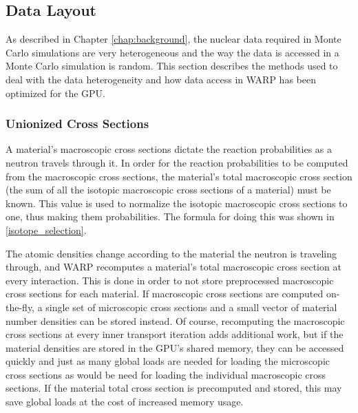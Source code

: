 
\subsection{Data Layout}

As described in Chapter \ref{chap:background}, the nuclear data required in Monte Carlo simulations are very heterogeneous and the way the data is accessed in a Monte Carlo simulation is random.  This section describes the methods used to deal with the data heterogeneity and how data access in WARP has been optimized for the GPU.

\subsubsection{Unionized Cross Sections}

A material's macroscopic cross sections dictate the reaction probabilities as a neutron travels through it.  In order for the reaction probabilities to be computed from the macroscopic cross sections, the material's total macroscopic cross section (the sum of all the isotopic macroscopic cross sections of a material) must be known.  This value is used to normalize the isotopic macroscopic cross sections to one, thus making them probabilities.  The formula for doing this was shown in \eqref{isotope_selection}.

The atomic densities change according to the material the neutron is traveling through, and WARP recomputes a material's total macroscopic cross section at every interaction.  This is done in order to not store preprocessed macroscopic cross sections for each material.  If macroscopic cross sections are computed on-the-fly, a single set of microscopic cross sections and a small vector of material number densities can be stored instead.  Of course, recomputing the macroscopic cross sections at every inner transport iteration adds additional work, but if the material densities are stored in the GPU's shared memory, they can be accessed quickly and just as many global loads are needed for loading the microscopic cross sections as would be need for loading the individual macroscopic cross sections.  If the material total cross section is precomputed and stored, this may save global loads at the cost of increased memory usage.


